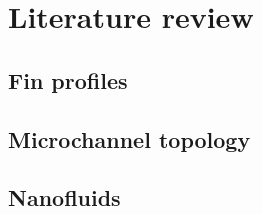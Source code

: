 \documentclass[../main.tex]{subfiles}
\begin{document}
\section{Literature review}

\blindtext

\subsection{Fin profiles}
\blindtext {}

\subsection{Microchannel topology}
\blindtext

\subsection{Nanofluids}
\blindtext
{}
\end{document}
